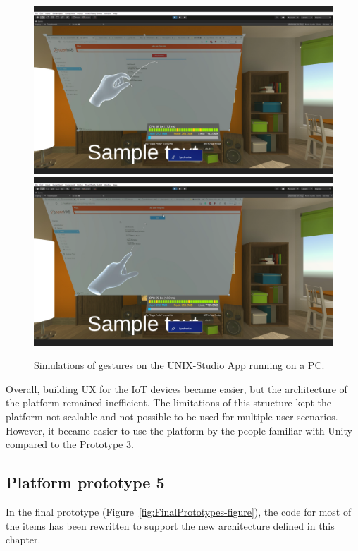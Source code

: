 \begin{figure}
  \centering
    {\includegraphics[width=0.45\linewidth]{figures/InputSimulation1.png}}
    {\includegraphics[width=0.45\linewidth]{figures/InputSimulation2.png}}
  \caption{Simulations of gestures on the UNIX-Studio App running on a PC.}
  \label{fig:InputSimulation-figure}
\end{figure}

 Overall, building UX for the IoT devices became easier, but the architecture of the platform remained inefficient. The limitations of this structure kept the platform not scalable and not possible to be used for multiple user scenarios. However, it became easier to use the platform by the people familiar with Unity compared to the Prototype 3.

\subsection{Platform prototype 5}

In the final prototype (Figure~\ref{fig:FinalPrototypes-figure}), the code for most of the items has been rewritten to support the new architecture defined in this chapter. 

